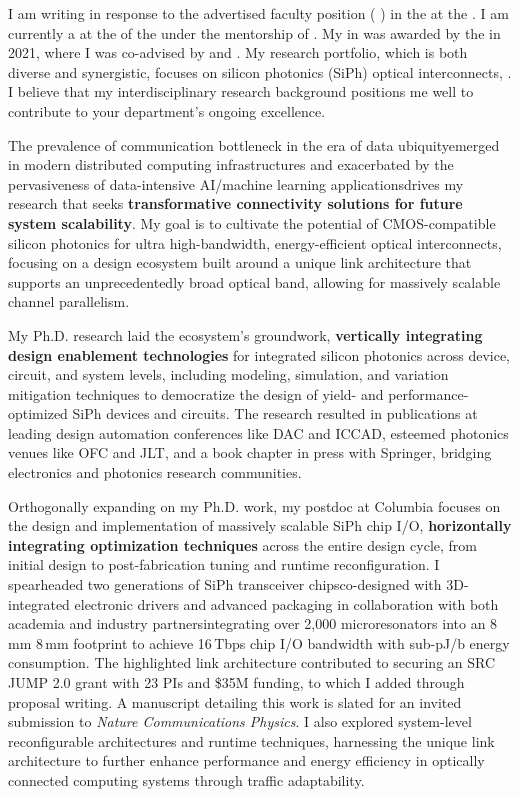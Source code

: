 I am writing in response to the advertised faculty position (\textbf{\appPosition{} \appJobID}) in the \appDept{} at the \appSchool{}. I am currently a \myTitle{} at the \myDept{} of the \mySchoolShort{} under the mentorship of \mySuper{}. My \myDegree{} in \myMajor{} was awarded by the \myPhDSchool{} in 2021, where I was co-advised by \myAdvisor{} and \myCoAdvisor{}. My research portfolio, which is both diverse and synergistic, focuses on silicon photonics (SiPh) optical interconnects, \appSpecific{}. I believe that my interdisciplinary research background positions me well to contribute to your department's ongoing excellence.

The prevalence of communication bottleneck in the era of data ubiquity\textemdash emerged in modern distributed computing infrastructures and exacerbated by the pervasiveness of data-intensive AI/machine learning applications\textemdash drives my research that seeks \textbf{transformative connectivity solutions for future system scalability}. My goal is to cultivate the potential of CMOS-compatible silicon photonics for ultra high-bandwidth, energy-efficient optical interconnects, focusing on a design ecosystem built around a unique link architecture that supports an unprecedentedly broad optical band, allowing for massively scalable channel parallelism.

My Ph.D. research laid the ecosystem's groundwork, \textbf{vertically integrating design enablement technologies} for integrated silicon photonics across device, circuit, and system levels, including modeling, simulation, and variation mitigation techniques to democratize the design of yield- and performance-optimized SiPh devices and circuits. The research resulted in publications at leading design automation conferences like DAC and ICCAD, esteemed photonics venues like OFC and JLT, and a book chapter in press with Springer, bridging electronics and photonics research communities.

Orthogonally expanding on my Ph.D. work, my postdoc at Columbia focuses on the design and implementation of massively scalable SiPh chip I/O, \textbf{horizontally integrating optimization techniques} across the entire design cycle, from initial design to post-fabrication tuning and runtime reconfiguration. I spearheaded two generations of SiPh transceiver chips\textemdash co-designed with 3D-integrated electronic drivers and advanced packaging in collaboration with both academia and industry partners\textemdash integrating over 2,000 microresonators into an 8\,mm \texttimes{} 8\,mm footprint to achieve 16\,Tbps chip I/O bandwidth with sub-pJ/b energy consumption. The highlighted link architecture contributed to securing an SRC JUMP 2.0 grant with 23 PIs and \$35M funding, to which I added through proposal writing. A manuscript detailing this work is slated for an invited submission to \emph{Nature Communications Physics}. I also explored system-level reconfigurable architectures and runtime techniques, harnessing the unique link architecture to further enhance performance and energy efficiency in optically connected computing systems through traffic adaptability.

